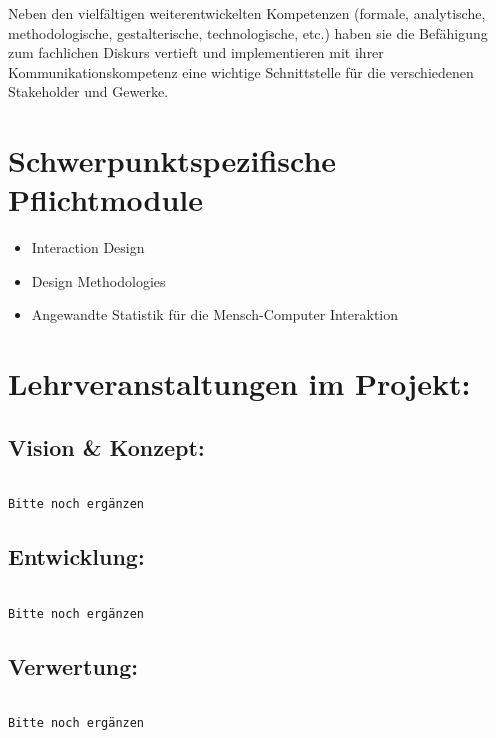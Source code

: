 Neben den vielfältigen weiterentwickelten Kompetenzen (formale,
analytische, methodologische, gestalterische, technologische, etc.)
haben sie die Befähigung zum fachlichen Diskurs vertieft und
implementieren mit ihrer Kommunikationskompetenz eine wichtige
Schnittstelle für die verschiedenen Stakeholder und Gewerke.

\section*{Schwerpunktspezifische
Pflichtmodule}\label{schwerpunktspezifische-pflichtmodule}

\begin{itemize}
\item
  Interaction Design
\item
  Design Methodologies
\item
  Angewandte Statistik für die Mensch-Computer Interaktion
\end{itemize}

\section*{Lehrveranstaltungen im
Projekt:}\label{lehrveranstaltungen-im-projekt}

\subsection*{Vision \& Konzept:}\label{vision-konzept}

\begin{verbatim}

Bitte noch ergänzen
\end{verbatim}

\subsection*{Entwicklung:}\label{entwicklung}

\begin{verbatim}

Bitte noch ergänzen
\end{verbatim}

\subsection*{Verwertung:}\label{verwertung}

\begin{verbatim}

Bitte noch ergänzen
\end{verbatim}

